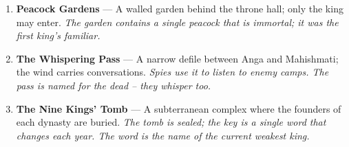 \documentclass[11pt]{book}
\begin{document}
\begin{enumerate}
\item[Q] \textbf{Peacock Gardens} — A walled garden behind the throne hall; only the king may enter. \textit{The garden contains a single peacock that is immortal; it was the first king’s familiar.}
\item[K] \textbf{The Whispering Pass} — A narrow defile between Anga and Mahishmati; the wind carries conversations. \textit{Spies use it to listen to enemy camps. The pass is named for the dead – they whisper too.}
\item[A] \textbf{The Nine Kings’ Tomb} — A subterranean complex where the founders of each dynasty are buried. \textit{The tomb is sealed; the key is a single word that changes each year. The word is the name of the current weakest king.}
\end{enumerate}
\end{document}
